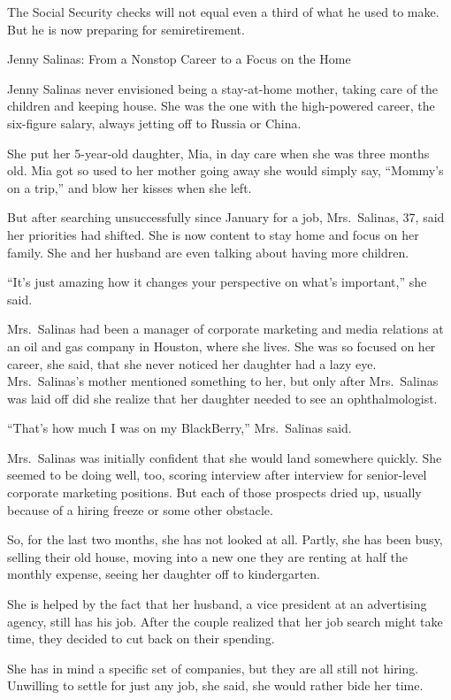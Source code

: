 ﻿\documentclass[12pt]{article}
\begin{document}
The Social Security checks will not equal even a third of what he used to make. But he is now
preparing for semiretirement.

Jenny Salinas: From a Nonstop Career to a Focus on the Home

Jenny Salinas never envisioned being a stay-at-home mother, taking care of the children and keeping
house. She was the one with the high-powered career, the six-figure salary, always jetting off to
Russia or China.

She put her 5-year-old daughter, Mia, in day care when she was three months old. Mia got so used to
her mother going away she would simply say, ``Mommy's on a trip,'' and blow her kisses when she
left.

But after searching unsuccessfully since January for a job, Mrs.~Salinas, 37, said her priorities
had shifted. She is now content to stay home and focus on her family. She and her husband are even
talking about having more children.

``It's just amazing how it changes your perspective on what's important,'' she said.

Mrs.~Salinas had been a manager of corporate marketing and media relations at an oil and gas company
in Houston, where she lives. She was so focused on her career, she said, that she never noticed her
daughter had a lazy eye. Mrs.~Salinas's mother mentioned something to her, but only after
Mrs.~Salinas was laid off did she realize that her daughter needed to see an ophthalmologist.

``That's how much I was on my BlackBerry,'' Mrs.~Salinas said.

Mrs.~Salinas was initially confident that she would land somewhere quickly. She seemed to be doing
well, too, scoring interview after interview for senior-level corporate marketing positions. But
each of those prospects dried up, usually because of a hiring freeze or some other obstacle.

So, for the last two months, she has not looked at all. Partly, she has been busy, selling their old
house, moving into a new one they are renting at half the monthly expense, seeing her daughter off
to kindergarten.

She is helped by the fact that her husband, a vice president at an advertising agency, still has his
job. After the couple realized that her job search might take time, they decided to cut back on
their spending.

She has in mind a specific set of companies, but they are all still not hiring. Unwilling to settle
for just any job, she said, she would rather bide her time.
\end{document}
